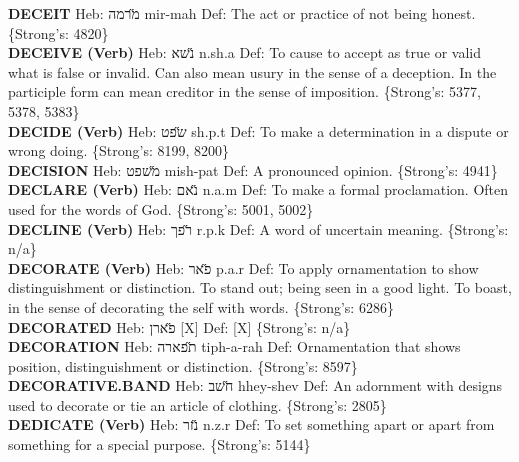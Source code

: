 {\textbf{DECEIT} Heb: {\large\H מרמה} mir-mah Def: The act or practice of not being honest. \{Strong's: 4820\}\hfill{}\\

\textbf{DECEIVE (Verb)} Heb: {\large\H נשא} n.sh.a Def: To cause to accept as true or valid what is false or invalid. Can also mean usury in the sense of a deception. In the participle form can mean creditor in the sense of imposition. \{Strong's: 5377, 5378, 5383\}\hfill{}\\

\textbf{DECIDE (Verb)} Heb: {\large\H שפט} sh.p.t Def: To make a determination in a dispute or wrong doing. \{Strong's: 8199, 8200\}\hfill{}\\

\textbf{DECISION} Heb: {\large\H משפט} mish-pat Def: A pronounced opinion. \{Strong's: 4941\}\hfill{}\\

\textbf{DECLARE (Verb)} Heb: {\large\H נאם} n.a.m Def: To make a formal proclamation. Often used for the words of God. \{Strong's: 5001, 5002\}\hfill{}\\

\textbf{DECLINE (Verb)} Heb: {\large\H רפך} r.p.k Def: A word of uncertain meaning. \{Strong's: n/a\}\hfill{}\\

\textbf{DECORATE (Verb)} Heb: {\large\H פאר} p.a.r Def: To apply ornamentation to show distinguishment or distinction. To stand out; being seen in a good light. To boast, in the sense of decorating the self with words. \{Strong's: 6286\}\hfill{}\\

\textbf{DECORATED} Heb: {\large\H פארן} {[}X{]} Def: {[}X{]} \{Strong's: n/a\}\hfill{}\\

\textbf{DECORATION} Heb: {\large\H תפארה} tiph-a-rah Def: Ornamentation that shows position, distinguishment or distinction. \{Strong's: 8597\}\hfill{}\\

\textbf{DECORATIVE.BAND} Heb: {\large\H חשב} hhey-shev Def: An adornment with designs used to decorate or tie an article of clothing. \{Strong's: 2805\}\hfill{}\\

\textbf{DEDICATE (Verb)} Heb: {\large\H נזר} n.z.r Def: To set something apart or apart from something for a special purpose. \{Strong's: 5144\}\hfill{}\\

}

